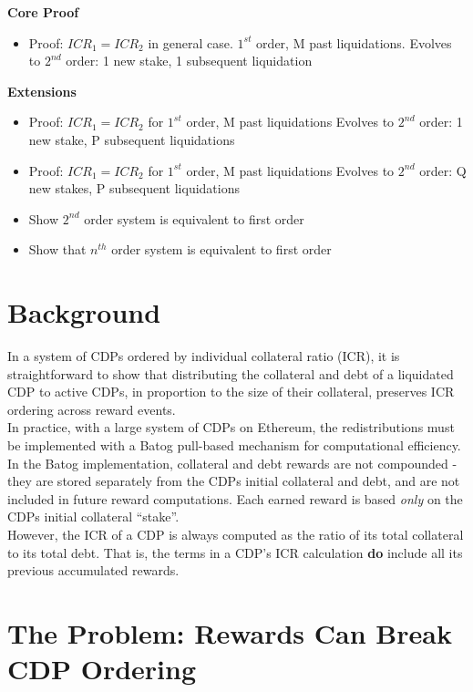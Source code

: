 \documentclass[reqno]{article}
\begin{document}
\bigskip
\textbf{Core Proof}

\begin{itemize}
  \item Proof: $ICR_1=ICR_2$ in general case. $1^{st}$ order, M past liquidations. Evolves to $2^{nd}$ order: 1 new stake, 1 subsequent liquidation
\end{itemize}

\bigskip
\textbf{Extensions}

\begin{itemize}
  \item Proof: $ICR_1=ICR_2$ for $1^{st}$ order, M past liquidations Evolves to $2^{nd}$ order: 1 new stake, P subsequent liquidations
  \item Proof: $ICR_1=ICR_2$ for $1^{st}$ order, M past liquidations Evolves to $2^{nd}$ order: Q new stakes, P subsequent liquidations
  \item Show $2^{nd}$ order system is equivalent to first order 
  \item Show that $n^{th}$ order system is equivalent to first order
\end{itemize}

\section{Background}

In a system of CDPs ordered by individual collateral ratio (ICR), it is straightforward to show that distributing the collateral and debt of a liquidated CDP to active CDPs, in proportion to the size of their collateral, preserves ICR ordering across reward events.\\

In practice, with a large system of CDPs on Ethereum, the redistributions must be implemented with a Batog pull-based mechanism for computational efficiency. In the Batog implementation, collateral and debt rewards are not compounded - they are stored separately from the CDPs initial collateral and debt, and are not included in future reward computations.  Each earned reward is based \textit{only} on the CDPs initial collateral “stake”.\\

However, the ICR of a CDP is always computed as the ratio of its total collateral to its total debt. That is, the terms in a CDP’s ICR calculation \textbf{do} include all its previous accumulated rewards.

\section{The Problem: Rewards Can Break CDP Ordering}
\end{document}
